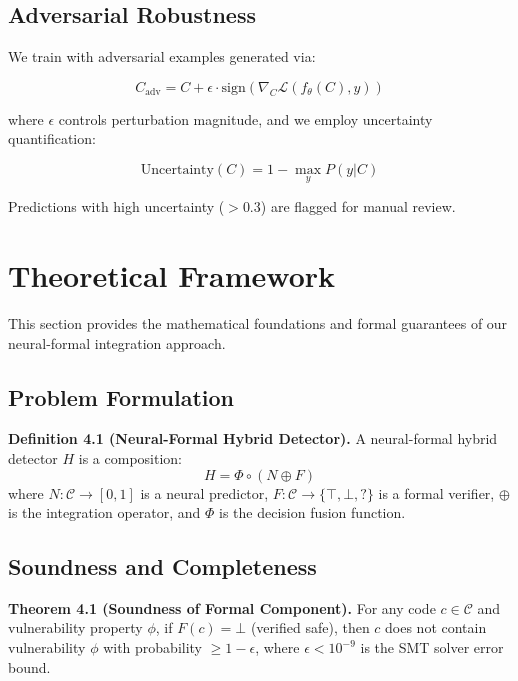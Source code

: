 \documentclass[10pt,journal,compsoc]{IEEEtran}
\begin{document}
\subsection{Adversarial Robustness}
We train with adversarial examples generated via:

\begin{equation}
C_{\text{adv}} = C + \epsilon \cdot \text{sign}(\nabla_C \mathcal{L}(f_\theta(C), y))
\end{equation}

where $\epsilon$ controls perturbation magnitude, and we employ uncertainty quantification:

\begin{equation}
\text{Uncertainty}(C) = 1 - \max_y P(y|C)
\end{equation}

Predictions with high uncertainty ($> 0.3$) are flagged for manual review.

\section{Theoretical Framework}

This section provides the mathematical foundations and formal guarantees of our neural-formal integration approach.

\subsection{Problem Formulation}

\textbf{Definition 4.1 (Neural-Formal Hybrid Detector).}
A neural-formal hybrid detector $H$ is a composition:
\begin{equation}
H = \Phi \circ (N \oplus F)
\end{equation}
where $N: \mathcal{C} \to [0,1]$ is a neural predictor, $F: \mathcal{C} \to \{\top, \bot, ?\}$ is a formal verifier, $\oplus$ is the integration operator, and $\Phi$ is the decision fusion function.

\subsection{Soundness and Completeness}

\textbf{Theorem 4.1 (Soundness of Formal Component).}
For any code $c \in \mathcal{C}$ and vulnerability property $\phi$, if $F(c) = \bot$ (verified safe), then $c$ does not contain vulnerability $\phi$ with probability $\geq 1 - \epsilon$, where $\epsilon < 10^{-9}$ is the SMT solver error bound.
\end{document}

